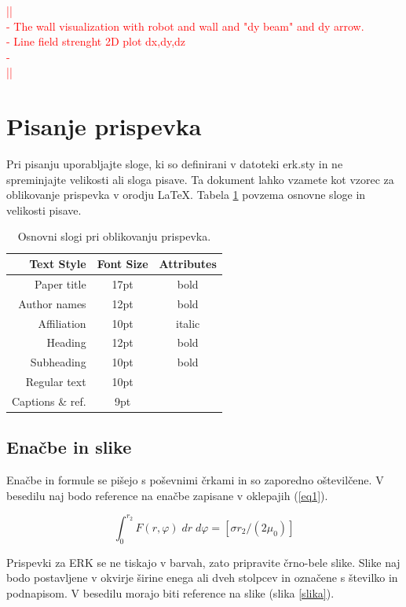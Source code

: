 \documentclass[a4paper]{article}
\newcommand\todocomment[1]{\textcolor{red}{||\\ #1\\||}}
\begin{document}
\todocomment{- The wall visualization with robot and wall and "dy beam" and dy arrow. \\
			 - Line field strenght 2D plot dx,dy,dz \\
		 	 - }

\section{Pisanje prispevka}

Pri pisanju uporabljajte sloge, ki so definirani v datoteki erk.sty in ne spreminjajte velikosti ali sloga pisave. Ta dokument lahko vzamete kot vzorec za oblikovanje prispevka v orodju \LaTeX.
Tabela \ref{tab1} povzema osnovne sloge in velikosti pisave.

\begin{table}[h]
\caption{Osnovni slogi pri oblikovanju prispevka.} \label{tab1}
\smallskip
\begin{center}
\begin{tabular}{ | r | c | c | }
\hline  
  \textbf{Text Style} & \textbf{Font Size} & \textbf{Attributes}\\ 
\hline  
  Paper title & 17pt & bold\\
  Author names & 12pt & bold\\
  Affiliation & 10pt & italic\\
  Heading & 12pt & bold \\
  Subheading & 10pt & bold\\
  Regular text & 10pt &\\
  Captions \& ref. & 9pt &\\
\hline  
\end{tabular}
\end{center}
\end{table}

\subsection{Enačbe in slike}

Enačbe in formule se pišejo s poševnimi črkami in so zaporedno oštevilčene. V besedilu naj bodo reference na enačbe zapisane v oklepajih (\ref{eq1}).

\begin{equation}
 \int^{r_{2}}_{0}F(r,\varphi)\; dr\; d\varphi= [\sigma r_{2} / (2\mu_{0})]
    \label{eq1}
\end{equation}

Prispevki za ERK se ne tiskajo v barvah, zato pripravite črno-bele slike. Slike naj bodo postavljene v okvirje širine enega ali dveh stolpcev in označene s številko in podnapisom. V besedilu morajo biti reference na slike (slika \ref{slika}).
\end{document}
